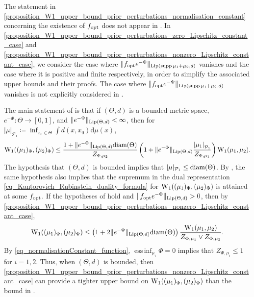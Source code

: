 \documentclass[a4paper]{scrartcl}
\theoremstyle{definition}
\numberwithin{equation}{section}
\newcommand{\rd}{\mathrm{d}}
\newcommand{\diam}[1]{\textup{diam}({#1})}
\DeclareMathOperator{\supp}{supp}
\DeclareMathOperator*{\essinf}{ess\,inf}
\newcommand{\abs}[1]{\vert #1\vert}
\newcommand{\Abs}[1]{\left\vert#1\right\vert}
\newcommand{\norm}[1]{\Vert #1 \Vert}
\newcommand{\Lip}[0]{\textup{Lip}}
\newcommand{\Was}[0]{\textup{W}}
\newcommand{\opt}[0]{\textup{opt}}
\begin{document}
The statement in \cref{proposition_W1_upper_bound_prior_perturbations_normalisation_constant} concerning the existence of $f_\opt$ does not appear in \cite[Section 5]{Sprungk2020}.
In \cref{proposition_W1_upper_bound_prior_perturbations_zero_Lipschitz_constant_case} and \cref{proposition_W1_upper_bound_prior_perturbations_nonzero_Lipschitz_constant_case}, we consider the case where $\norm{f_\opt e^{-\Phi}}_{\Lip(\supp{\mu_1+\mu_2},d)}$ vanishes and the case where it is positive and finite respectively, in order to simplify the associated upper bounds and their proofs. 
The case where $\norm{f_\opt e^{-\Phi}}_{\Lip(\supp{\mu_1+\mu_2},d)}$ vanishes is not explicitly considered in \cite[Section 5]{Sprungk2020}.

The main statement of \cite[Theorem 15]{Sprungk2020} is that if $(\Theta,d)$ is a bounded metric space, $e^{-\Phi}:\Theta\to [0,1]$, and $\norm{e^{-\Phi}}_{\Lip(\Theta,d)}<\infty$, then for $\abs{\mu}_{\mathcal{P}_1}\coloneqq\inf_{x_0\in\Theta}\int d(x,x_0)\rd \mu(x)$,
 \begin{equation}
 \label{eq_W1_bound_from_Sprungk2020}
  \Was_1((\mu_1)_\Phi,(\mu_2)_\Phi)\leq \frac{1+\norm{e^{-\Phi}}_{\Lip(\Theta,d)}\diam{\Theta}}{Z_{\Phi,\mu_2}}\left(1+\norm{e^{-\Phi}}_{\Lip(\Theta,d)}\frac{\Abs{\mu_1}_{\mathcal{P}_1}}{Z_{\Phi,\mu_1}}\right)\Was_1(\mu_1,\mu_2).
 \end{equation}
 The hypothesis that $(\Theta,d)$ is bounded implies that $\abs{\mu}_{\mathcal{P}_1}\leq \diam{\Theta}$.
 By , the same hypothesis also implies that the supremum in the dual representation \eqref{eq_Kantorovich_Rubinstein_duality_formula} for $\Was_1((\mu_1)_\Phi,(\mu_2)_\Phi)$ is attained at some $f_\opt$.
 If the hypotheses of \cite[Theorem 15]{Sprungk2020} hold and $\norm{f_\opt e^{-\Phi}}_{\Lip(\Theta,d)}>0$, then by \ref{proposition_W1_upper_bound_prior_perturbations_nonzero_Lipschitz_constant_case},
 \begin{equation}
 \label{eq_W1_bound_for_comparison}
  \Was_1((\mu_1)_\Phi,(\mu_2)_\Phi)\leq \left(1+2\norm{e^{-\Phi}}_{\Lip(\Theta,d)}\diam{\Theta}\right)\frac{\Was_1(\mu_1,\mu_2)}{Z_{\Phi,\mu_1}\vee Z_{\Phi,\mu_2}}.
 \end{equation}
By \eqref{eq_normalisationConstant_function}, $\essinf_{\mu_i}\Phi=0$ implies that $Z_{\Phi,\mu_i}\leq 1$ for $i=1,2$.
Thus, when $(\Theta,d)$ is bounded, then \ref{proposition_W1_upper_bound_prior_perturbations_nonzero_Lipschitz_constant_case} can provide a tighter upper bound on $\Was_1((\mu_1)_\Phi,(\mu_2)_\Phi)$ than the bound in \cite[Theorem 15]{Sprungk2020}.
\end{document}
